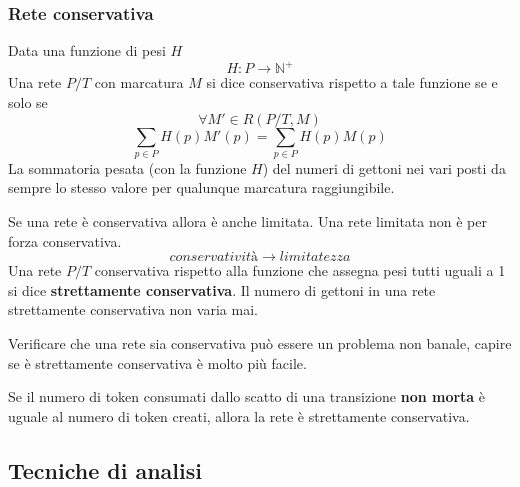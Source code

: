 \documentclass[12pt, twoside, letterpaper]{article}
\begin{document}
			\subsubsection{Rete conservativa}
				Data una funzione di pesi $H$ $$H: P \rightarrow \mathbb{N}^+$$
				Una rete $P/T$ con marcatura $M$ si dice conservativa rispetto a tale funzione se e solo se 
				$$\forall M' \in R(P/T,M)$$
				$$\sum_{p \in P} H(p)M'(p) = \sum_{p \in P} H(p)M(p)$$
				La sommatoria pesata (con la funzione $H$) del numeri di gettoni nei vari posti da sempre lo stesso valore per qualunque marcatura raggiungibile.

				Se una rete è conservativa allora è anche limitata. Una rete limitata non è per forza conservativa.
				$$conservativit\textit{à} \rightarrow limitatezza$$
				Una rete $P/T$ conservativa rispetto alla funzione che assegna pesi tutti uguali a 1 si dice \textbf{strettamente conservativa}. Il numero di gettoni in una rete strettamente conservativa non varia mai.
				
				Verificare che una rete sia conservativa può essere un problema non banale, capire se è strettamente conservativa è molto più facile. 
				
				Se il numero di token consumati dallo scatto di una transizione \textbf{non morta} è uguale al numero di token creati, allora la rete è strettamente conservativa.
		
		\subsection{Tecniche di analisi}
			
			
		
\end{document}
